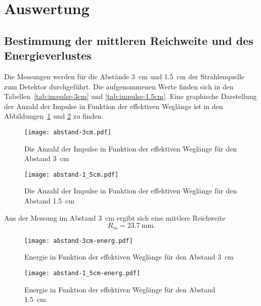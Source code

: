 
\section{Auswertung}

\subsection{Bestimmung der mittleren Reichweite und des Energieverlustes}
\label{sec:mittlere-reichweite}

Die Messungen werden für die Abstände \SI{3}{\centi\metre} und
\SI{1.5}{\centi\metre} der Strahlenquelle zum Detektor durchgeführt.
Die aufgenommenen Werte finden sich in den
Tabellen~\ref{tab:impulse-3cm} und \ref{tab:impulse-1.5cm}. Eine
graphische Darstellung der Anzahl der Impulse in Funktion der effektiven
Weglänge ist in den Abbildungen~\ref{fig:impulse-3cm} und
\ref{fig:impulse-1.5cm} zu finden.

\begin{figure}
  \centering
  \texttt{[image: abstand-3cm.pdf]}
  \caption{Die Anzahl der Impulse in Funktion der effektiven Weglänge
    für den Abstand \SI{3}{\centi\metre}}
  \label{fig:impulse-3cm}
\end{figure}

\begin{figure}
  \centering
  \texttt{[image: abstand-1\_5cm.pdf]}
  \caption{Die Anzahl der Impulse in Funktion der effektiven Weglänge
    für den Abstand \SI{1.5}{\centi\metre}}
  \label{fig:impulse-1.5cm}
\end{figure}

Aus der Messung im Abstand \SI{3}{\centi\metre} ergibt sich eine
mittlere Reichweite
%
\begin{equation}
  \label{eq:mittlere-reichw-3cm}
  R_m = \SI{23.7}{\milli\metre}\text{.}
\end{equation}

\begin{figure}
  \centering
  \texttt{[image: abstand-3cm-energ.pdf]}
  \caption{Energie in Funktion der effektiven Weglänge für den Abstand
    \SI{3}{\centi\metre}}
  \label{fig:energie-3cm}
\end{figure}

\begin{figure}
  \centering
  \texttt{[image: abstand-1\_5cm-energ.pdf]}
  \caption{Energie in Funktion der effektiven Weglänge für den Abstand
    \SI{1.5}{\centi\metre}}
  \label{fig:energie-1.5cm}
\end{figure}

